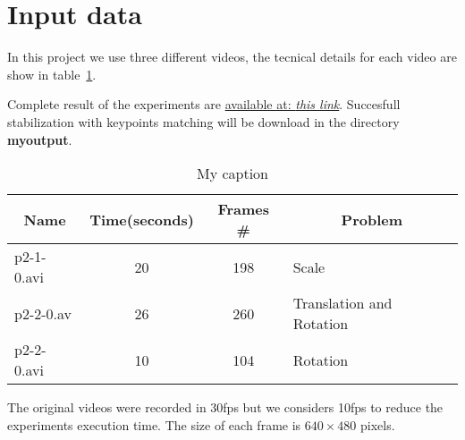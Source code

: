 \section{Input data}

In this project we use three different videos, the tecnical details for each video are show in table~\ref{table:inputs}.

Complete result of the experiments are \href{https://drive.google.com/open?id=0Bx_3lNzg57uuelRFc2JGWjR5ZkE}{available at: \textit{this link}}. Succesfull stabilization with keypoints matching will be download in the directory \textbf{myoutput}.
\begin{table}[H]
\centering
\caption{My caption}
\label{my-label}
\begin{tabular}{|l|c|c|l|}
\hline
\multicolumn{1}{|c|}{\textbf{Name}} & \textbf{Time(seconds)} & \textbf{Frames \#} & \multicolumn{1}{c|}{\textbf{Problem}} \\ \hline
p2-1-0.avi & 20 & 198 & Scale \\ \hline
p2-2-0.av & 26 & 260 & Translation and Rotation \\ \hline
p2-2-0.avi & 10 & 104 & Rotation \\ \hline
\end{tabular}
\label{table:inputs}
\end{table}

The original videos were recorded in 30fps but we considers 10fps to reduce the experiments execution time. The size of each frame is $640\times 480$ pixels.
